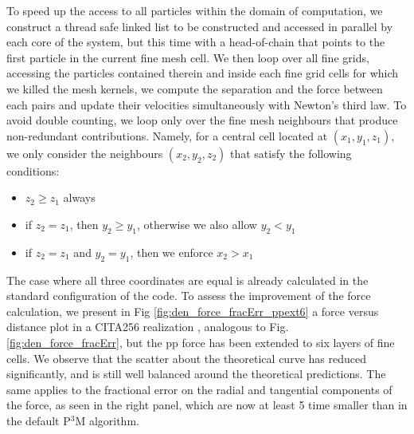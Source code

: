  To speed up the access to all particles within the domain of computation, we construct a thread safe linked list
 to be constructed and accessed in parallel by each core of the system, but this time with a head-of-chain that points to the first particle in the current fine mesh cell. We then loop over all fine grids, accessing the particles contained therein and inside each fine grid cells for which we killed the mesh kernels,
 we compute the separation and the force between each pairs and update their velocities simultaneously with Newton's third law. 
 To avoid double counting, we loop only over the fine mesh neighbours that produce non-redundant contributions. Namely, for a central cell located at 
 $(x_1, y_1, z_1)$, we only consider the neighbours $(x_2, y_2, z_2)$ that satisfy the following conditions:
 \begin{itemize}
 \item{$z_2 \ge z_1$ always}
 \item{if $z_2 = z_1$, then $y_2 \ge y_1$, otherwise we also allow $y_2 < y_1$} 
 \item{if $z_2 = z_1$ and $y_2 = y_1$, then we enforce $x_2 > x_1$}
 \end{itemize}
 The case where all three coordinates are equal is already calculated in the standard configuration of the code.
 To assess the improvement of the force calculation, we present in Fig \ref{fig:den_force_fracErr_ppext6} a force versus distance
 plot in a CITA256 realization , analogous to Fig. \ref{fig:den_force_fracErr}, but the pp force has been extended to six layers of fine cells. 
 We observe that the scatter about the theoretical curve has reduced significantly, and is still well balanced around the theoretical predictions.
 The same applies to the fractional error on the radial and tangential components of the force, as seen in the right panel,
 which are now at least 5 time smaller than in the default P$^{3}$M algorithm.
 
